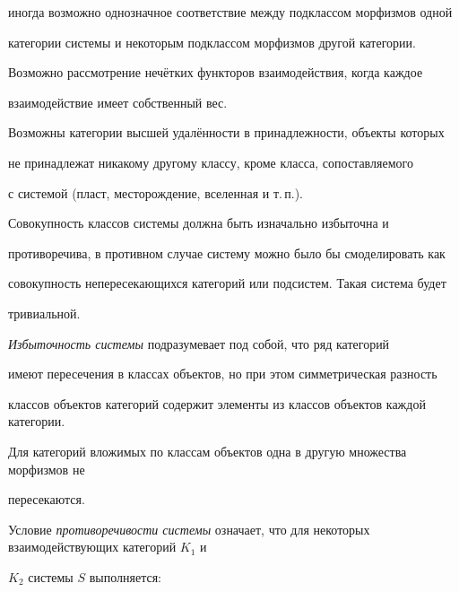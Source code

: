 иногда возможно однозначное соответствие между подклассом морфизмов одной

категории системы и некоторым подклассом морфизмов другой категории.

Возможно рассмотрение нечётких функторов взаимодействия, когда каждое

взаимодействие имеет собственный вес.

Возможны категории высшей удалённости в принадлежности, объекты которых

не принадлежат никакому другому классу, кроме класса, сопоставляемого

с системой (пласт, месторождение, вселенная и т.\,п.).

Совокупность классов системы должна быть изначально избыточна и

противоречива, в противном случае систему можно было бы смоделировать как

совокупность непересекающихся категорий или подсистем. Такая система будет

тривиальной.



\textit{Избыточность системы} подразумевает под собой, что ряд категорий

имеют пересечения в классах объектов, но при этом симметрическая разность

классов объектов категорий содержит элементы из классов объектов каждой категории.

Для категорий вложимых по классам объектов одна в другую множества морфизмов не

пересекаются.



Условие \textit{противоречивости системы} означает, что для некоторых взаимодействующих категорий $K_1$ и

$K_2$ системы $S$ выполняется:

